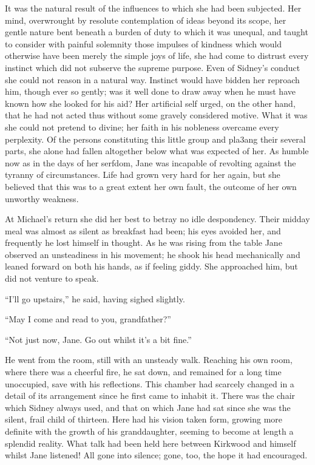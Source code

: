 It was the natural result of the influences to which she had been
subjected. Her mind, overwrought by resolute contemplation of ideas
beyond its scope, her gentle nature bent
{\protect\hypertarget{141}{}{}}beneath a burden of duty to which it was
unequal, and taught to consider with painful solemnity those impulses of
kindness which would otherwise have been merely the simple joys of life,
she had come to distrust every instinct which did not subserve the
supreme purpose. Even of Sidney's conduct she could not reason in a
natural way. Instinct would have bidden her reproach him, though ever so
gently; was it well done to draw away when he must have known how she
looked for his aid? Her artificial self urged, on the other hand, that
he had not acted thus without some gravely considered motive. What it
was she could not pretend to divine; her faith in his nobleness overcame
every perplexity. Of the persons constituting this little group and
pla3ang their several parts, she alone had fallen altogether below what
was expected of her. As humble now as in the days of her serfdom, Jane
was incapable of revolting against the tyranny of circumstances. Life
had grown very hard for her again, but she believed that this was to a
great extent her own fault, the outcome of her own unworthy weakness.

{\protect\hypertarget{142}{}{}}At Michael's return she did her best to
betray no idle despondency. Their midday meal was almost as silent as
breakfast had been; his eyes avoided her, and frequently he lost himself
in thought. As he was rising from the table Jane observed an
unsteadiness in his movement; he shook his head mechanically and leaned
forward on both his hands, as if feeling giddy. She approached him, but
did not venture to speak.

``I'll go upstairs,'' he said, having sighed slightly.

``May I come and read to you, grandfather?''

``Not just now, Jane. Go out whilst it's a bit fine.''

He went from the room, still with an unsteady walk. Reaching his own
room, where there was a cheerful fire, he sat down, and remained for a
long time unoccupied, save with his reflections. This chamber had
scarcely changed in a detail of its arrangement since he first came to
inhabit it. There was the chair which Sidney always used, and that on
which Jane had sat since she was the silent, frail child of thirteen.
Here had his vision taken form, growing more definite with the growth of
his {\protect\hypertarget{143}{}{}}granddaughter, seeming to become at
length a splendid reality. What talk had been held here between Kirkwood
and himself whilst Jane listened! All gone into silence; gone, too, the
hope it had encouraged.

